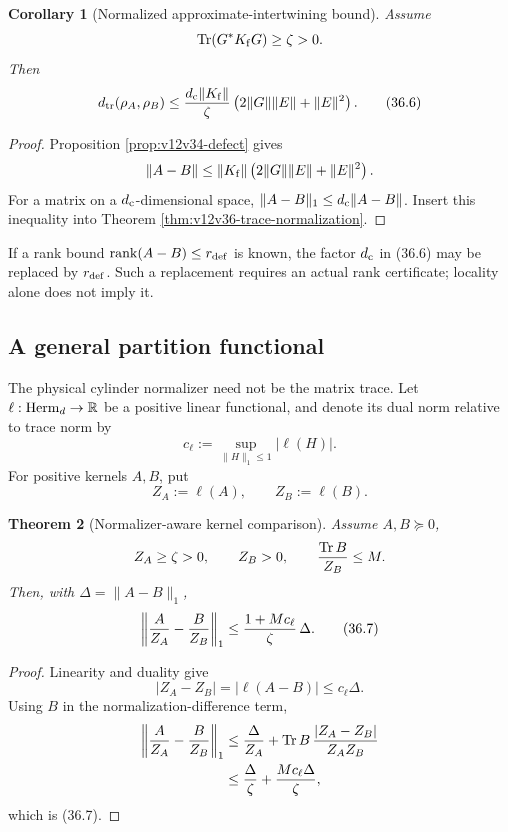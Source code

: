 \documentclass[11pt]{article}
\newtheorem{theorem}{Theorem}[section]
\newtheorem{corollary}[theorem]{Corollary}
\theoremstyle{remark}
\begin{document}
\begin{corollary}[Normalized approximate-intertwining bound]
\label{cor:v12v36-intertwining}
Assume
\[
 \operatorname{Tr}(G^*K_{\rm f}G)\geq\zeta>0.
\]
Then
\begin{equation}
 d_{\rm tr}(\rho_A,\rho_B)
 \leq
 {d_{\rm c}\|K_{\rm f}\|\over\zeta}
 \left(2\|G\|\|E\|+\|E\|^2\right).               \tag{36.6}
\end{equation}
\end{corollary}

\begin{proof}
Proposition \ref{prop:v12v34-defect} gives
\[
 \|A-B\|
 \leq
 \|K_{\rm f}\|
 \left(2\|G\|\|E\|+\|E\|^2\right).
\]
For a matrix on a \(d_{\rm c}\)-dimensional space,
\(\|A-B\|_1\leq d_{\rm c}\|A-B\|\).
Insert this inequality into Theorem
\ref{thm:v12v36-trace-normalization}.
\end{proof}

If a rank bound
\(\operatorname{rank}(A-B)\leq r_{\rm def}\) is known, the factor
\(d_{\rm c}\) in (36.6) may be replaced by \(r_{\rm def}\).  Such a
replacement requires an actual rank certificate; locality alone
does not imply it.

\subsection{A general partition functional}

The physical cylinder normalizer need not be the matrix trace.  Let
\(\ell:{\rm Herm}_{d}\to\mathbb R\) be a positive linear functional,
and denote its dual norm relative to trace norm by
\[
 c_\ell:=\sup_{\|H\|_1\leq1}|\ell(H)|.
\]
For positive kernels \(A,B\), put
\[
 Z_A:=\ell(A),\qquad Z_B:=\ell(B).
\]

\begin{theorem}[Normalizer-aware kernel comparison]
\label{thm:v12v36-general-normalizer}
Assume \(A,B\succeq0\),
\[
 Z_A\geq\zeta>0,\qquad Z_B>0,\qquad
 {\operatorname{Tr}B\over Z_B}\leq M.
\]
Then, with \(\Delta=\|A-B\|_1\),
\begin{equation}
 \left\|
 {A\over Z_A}-{B\over Z_B}
 \right\|_1
 \leq
 {1+Mc_\ell\over\zeta}\,\Delta.                  \tag{36.7}
\end{equation}
\end{theorem}

\begin{proof}
Linearity and duality give
\[
 |Z_A-Z_B|=|\ell(A-B)|\leq c_\ell\Delta.
\]
Using \(B\) in the normalization-difference term,
\begin{align*}
 \left\|
 {A\over Z_A}-{B\over Z_B}
 \right\|_1
 &\leq
 {\Delta\over Z_A}
 +
 \operatorname{Tr}B\,
 { |Z_A-Z_B|\over Z_AZ_B}\\
 &\leq
 {\Delta\over\zeta}
 +
 {M c_\ell\Delta\over\zeta},
\end{align*}
which is (36.7).
\end{proof}
\end{document}
